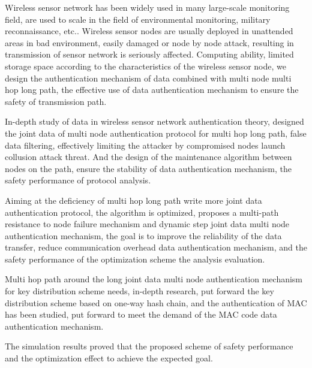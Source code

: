 \begin{eabstract}
Wireless sensor network has been widely used in many large-scale monitoring field, are used to scale in the field of environmental monitoring, military reconnaissance, etc.. Wireless sensor nodes are usually deployed in unattended areas in bad environment, easily damaged or node by node attack, resulting in transmission of sensor network is seriously affected. Computing ability, limited storage space according to the characteristics of the wireless sensor node, we design the authentication mechanism of data combined with multi node multi hop long path, the effective use of data authentication mechanism to ensure the safety of transmission path.

In-depth study of data in wireless sensor network authentication theory, designed the joint data of multi node authentication protocol for multi hop long path, false data filtering, effectively limiting the attacker by compromised nodes launch collusion attack threat. And the design of the maintenance algorithm between nodes on the path, ensure the stability of data authentication mechanism, the safety performance of protocol analysis.

Aiming at the deficiency of multi hop long path write more joint data authentication protocol, the algorithm is optimized, proposes a multi-path resistance to node failure mechanism and dynamic step joint data multi node authentication mechanism, the goal is to improve the reliability of the data transfer, reduce communication overhead data authentication mechanism, and the safety performance of the optimization scheme the analysis evaluation.

Multi hop path around the long joint data multi node authentication mechanism for key distribution scheme needs, in-depth research, put forward the key distribution scheme based on one-way hash chain, and the authentication of MAC has been studied, put forward to meet the demand of the MAC code data authentication mechanism.

The simulation results proved that the proposed scheme of safety performance and the optimization effect to achieve the expected goal.

\end{eabstract}

